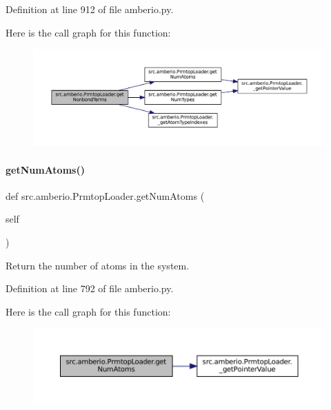 Definition at line 912 of file amberio.\+py.

Here is the call graph for this function\+:
\nopagebreak
\begin{figure}[H]
\begin{center}
\leavevmode
\includegraphics[width=350pt]{classsrc_1_1amberio_1_1PrmtopLoader_a23d0b10c76fb39e206cf6841ff6f56ce_cgraph}
\end{center}
\end{figure}
\mbox{\label{classsrc_1_1amberio_1_1PrmtopLoader_ab1f407476fadeeafa5875158140bdd37}} 
\paragraph{\texorpdfstring{get\+Num\+Atoms()}{getNumAtoms()}}
{\footnotesize\ttfamily def src.\+amberio.\+Prmtop\+Loader.\+get\+Num\+Atoms (\begin{DoxyParamCaption}\item[{}]{self }\end{DoxyParamCaption})}



Return the number of atoms in the system. 



Definition at line 792 of file amberio.\+py.

Here is the call graph for this function\+:
\nopagebreak
\begin{figure}[H]
\begin{center}
\leavevmode
\includegraphics[width=350pt]{classsrc_1_1amberio_1_1PrmtopLoader_ab1f407476fadeeafa5875158140bdd37_cgraph}
\end{center}
\end{figure}
\mbox{\label{classsrc_1_1amberio_1_1PrmtopLoader_ab5fd1aa3c74924b90c4582cc7e15a7ab}} 
